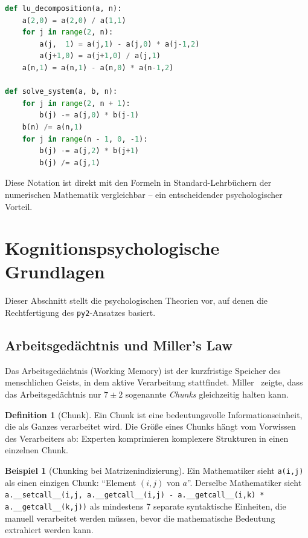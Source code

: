 ﻿\documentclass[a4paper,12pt]{article}
\theoremstyle{definition}
\newtheorem{definition}{Definition}
\newtheorem{beispiel}{Beispiel}
\begin{document}
\begin{lstlisting}[language=Python, caption={Crout-LU-Zerlegung in py2-Syntax -- mathematisch transparent}]
def lu_decomposition(a, n):
    a(2,0) = a(2,0) / a(1,1)
    for j in range(2, n):
        a(j,  1) = a(j,1) - a(j,0) * a(j-1,2)
        a(j+1,0) = a(j+1,0) / a(j,1)
    a(n,1) = a(n,1) - a(n,0) * a(n-1,2)

def solve_system(a, b, n):
    for j in range(2, n + 1):
        b(j) -= a(j,0) * b(j-1)
    b(n) /= a(n,1)
    for j in range(n - 1, 0, -1):
        b(j) -= a(j,2) * b(j+1)
        b(j) /= a(j,1)
\end{lstlisting}

Diese Notation ist direkt mit den Formeln in Standard-Lehrb\"uchern der numerischen
Mathematik vergleichbar -- ein entscheidender psychologischer Vorteil.

\section{Kognitionspsychologische Grundlagen}

Dieser Abschnitt stellt die psychologischen Theorien vor, auf denen die Rechtfertigung
des \texttt{py2}-Ansatzes basiert.

\subsection{Arbeitsged\"achtnis und Miller's Law}

Das Arbeitsged\"achtnis (Working Memory) ist der kurzfristige Speicher des menschlichen
Geists, in dem aktive Verarbeitung stattfindet. Miller~\cite{miller1956} zeigte, dass
das Arbeitsged\"achtnis nur $7 \pm 2$ sogenannte \emph{Chunks} gleichzeitig halten kann.

\begin{definition}[Chunk]
	Ein Chunk ist eine bedeutungsvolle Informationseinheit, die als Ganzes verarbeitet
	wird. Die Gr\"o\ss{}e eines Chunks h\"angt vom Vorwissen des Verarbeiters ab:
	Experten komprimieren komplexere Strukturen in einen einzelnen Chunk.
\end{definition}

\begin{beispiel}[Chunking bei Matrizenindizierung]
	Ein Mathematiker sieht \texttt{a(i,j)} als einen einzigen Chunk: ``Element $(i,j)$
	von $a$''. Derselbe Mathematiker sieht \texttt{a.\_\_setcall\_\_(i,j, a.\_\_getcall\_\_(i,j)
	- a.\_\_getcall\_\_(i,k) * a.\_\_getcall\_\_(k,j))} als mindestens 7 separate syntaktische
	Einheiten, die manuell verarbeitet werden m\"ussen, bevor die mathematische Bedeutung
	extrahiert werden kann.
\end{beispiel}
\end{document}
